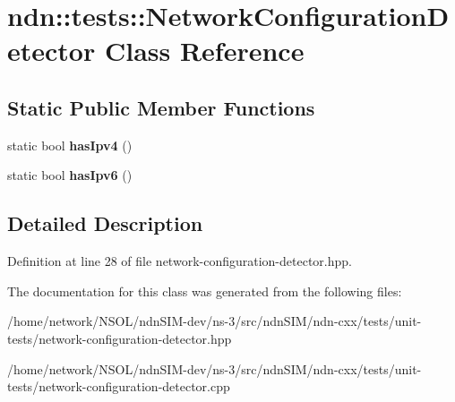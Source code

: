 \hypertarget{classndn_1_1tests_1_1NetworkConfigurationDetector}{}\section{ndn\+:\+:tests\+:\+:Network\+Configuration\+Detector Class Reference}
\label{classndn_1_1tests_1_1NetworkConfigurationDetector}
\subsection*{Static Public Member Functions}
\begin{DoxyCompactItemize}
\item 
static bool {\bfseries has\+Ipv4} ()\hypertarget{classndn_1_1tests_1_1NetworkConfigurationDetector_a1d08ac4230bb6096b8fe31380d1a1c46}{}\label{classndn_1_1tests_1_1NetworkConfigurationDetector_a1d08ac4230bb6096b8fe31380d1a1c46}

\item 
static bool {\bfseries has\+Ipv6} ()\hypertarget{classndn_1_1tests_1_1NetworkConfigurationDetector_a0822d38413ec9f72cc91e8521ed5e919}{}\label{classndn_1_1tests_1_1NetworkConfigurationDetector_a0822d38413ec9f72cc91e8521ed5e919}

\end{DoxyCompactItemize}


\subsection{Detailed Description}


Definition at line 28 of file network-\/configuration-\/detector.\+hpp.



The documentation for this class was generated from the following files\+:\begin{DoxyCompactItemize}
\item 
/home/network/\+N\+S\+O\+L/ndn\+S\+I\+M-\/dev/ns-\/3/src/ndn\+S\+I\+M/ndn-\/cxx/tests/unit-\/tests/network-\/configuration-\/detector.\+hpp\item 
/home/network/\+N\+S\+O\+L/ndn\+S\+I\+M-\/dev/ns-\/3/src/ndn\+S\+I\+M/ndn-\/cxx/tests/unit-\/tests/network-\/configuration-\/detector.\+cpp\end{DoxyCompactItemize}
